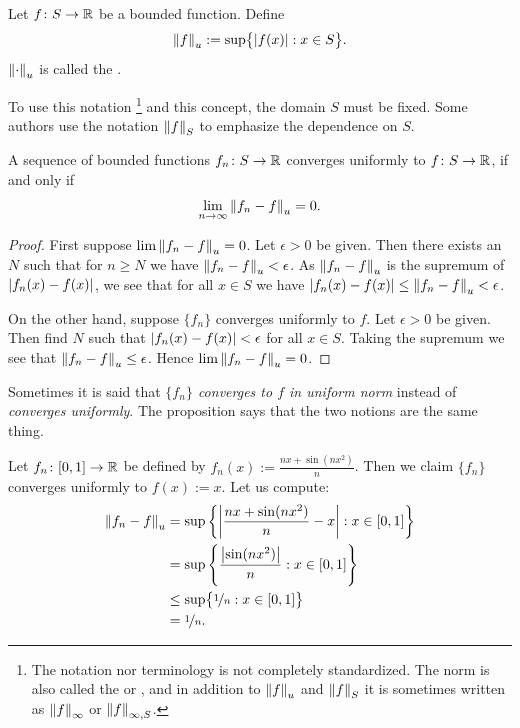 \begin{defn} \label{def:unifnorm}
Let $f \colon S \to {\mathbb{R}}$ be a bounded function.  Define
\begin{equation*}
\left\lVert {f} \right\rVert_u :=
\sup \bigl\{ \left\lvert {f(x)} \right\rvert : x \in S \bigr\} .
\end{equation*}
$\left\lVert {\cdot} \right\rVert_u$ is called the \emph{}.
\end{defn}

To use this notation%
\footnote{The notation nor terminology is not completely standardized.  The norm is
also called the
\emph{} or
\emph{}, and in addition
to $\left\lVert {f} \right\rVert_u$ and $\left\lVert {f} \right\rVert_S$ it is sometimes written
as $\left\lVert {f} \right\rVert_{\infty}$ or $\left\lVert {f} \right\rVert_{\infty,S}$.}
and this concept, the domain $S$ must be fixed.  Some authors
use
the notation
$\left\lVert {f} \right\rVert_S$ to emphasize the dependence on $S$.

\begin{prop}
A sequence of bounded functions $f_n \colon S \to {\mathbb{R}}$ converges
uniformly to $f \colon S \to {\mathbb{R}}$, if and only if
\begin{equation*}
\lim_{n\to\infty} \left\lVert {f_n - f} \right\rVert_u = 0 .
\end{equation*}
\end{prop}

\begin{proof}
First suppose 
$\lim \left\lVert {f_n - f} \right\rVert_u = 0$.  Let $\epsilon > 0$ be
given.  Then there exists an $N$ such that
for $n \geq N$ we have $\left\lVert {f_n - f} \right\rVert_u < \epsilon$.  As $\left\lVert {f_n-f} \right\rVert_u$
is the supremum of $\left\lvert {f_n(x)-f(x)} \right\rvert$, we see that for all $x \in S$
we have $\left\lvert {f_n(x)-f(x)} \right\rvert \leq \left\lVert {f_n - f} \right\rVert_u < \epsilon$.

On the other hand, suppose $\{ f_n \}$ converges uniformly to $f$.
Let $\epsilon > 0$ be given.  Then find $N$ such that 
$\left\lvert {f_n(x)-f(x)} \right\rvert < \epsilon$ for all $x \in S$.
Taking the supremum we see that
$\left\lVert {f_n - f} \right\rVert_u \leq \epsilon$.  Hence $\lim \left\lVert {f_n-f} \right\rVert_u = 0$.
\end{proof}

Sometimes it is said that \emph{$\{ f_n \}$ converges to $f$ in uniform norm}
instead of \emph{converges uniformly}.  The proposition
says that the two notions are the same thing.

\begin{example}
Let $f_n \colon [0,1] \to {\mathbb{R}}$ be defined by $f_n(x) := \frac{nx+ \sin(nx^2)}{n}$.
Then we claim $\{ f_n \}$ converges uniformly to $f(x) := x$.  Let us compute:
\begin{equation*}
\begin{split}
\left\lVert {f_n-f} \right\rVert_u
& =
\sup \left\{ \left\lvert {\frac{nx+ \sin(nx^2)}{n} - x} \right\rvert : x \in [0,1] \right\}
\\
& =
\sup \left\{ \frac{\left\lvert {\sin(nx^2)} \right\rvert}{n} : x \in [0,1] \right\}
\\
& \leq
\sup \bigl\{ \nicefrac{1}{n} : x \in [0,1] \bigr\}
\\
& = \nicefrac{1}{n}.
\end{split}
\end{equation*}
\end{example}

